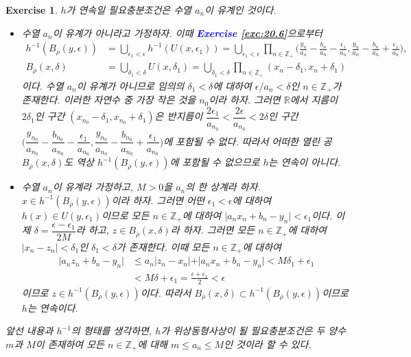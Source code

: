 \documentclass{article}
\newtheorem{exercise}{Exercise}[section]
\newcommand{\R}{\mathbb{R}}
\newcommand{\Z}{\mathbb{Z}}
\begin{document}
\begin{exercise}
    $h$가 연속일 필요충분조건은 수열 $a_n$이 유계인 것이다.
    \begin{itemize}
        \item[($\Longrightarrow$)] 수열 $a_n$이 유계가 아니라고 가정하자. 이때 \textcolor{blue}{\textbf{Exercise \ref{exc:20.6}}}으로부터
            \begin{align*}
                h^{-1}(B_{\overline{\rho}}(y,\epsilon))&=\bigcup_{\epsilon_1<\epsilon}h^{-1}(U(x,\epsilon_1))=\bigcup_{\epsilon_1<\epsilon}\prod_{n\in\Z_+}\biggl(\frac{y_n}{a_n}-\frac{b_n}{a_n}-\frac{\epsilon_1}{a_n},\frac{y_n}{a_n}-\frac{b_n}{a_n}+\frac{\epsilon_1}{a_n}\biggr),\\[6pt]
                B_{\overline{\rho}}(x,\delta)&=\bigcup_{\delta_1<\delta}U(x,\delta_1)=\bigcup_{\delta_1<\delta}\prod_{n\in\Z_+}(x_n-\delta_1,x_n+\delta_1)
            \end{align*}
            이다. 수열 $a_n$이 유계가 아니므로 임의의 $\delta_1<\delta$에 대하여 $\epsilon/a_n<\delta$인 $n\in\Z_+$가 존재한다. 이러한 자연수 중 가장 작은 것을 $n_0$이라 하자. 그러면 $\R$에서 지름이 $2\delta_1$인 구간 $(x_{n_0}-\delta_1,x_{n_0}+\delta_1)$은 반지름이 $\dfrac{2\epsilon_1}{a_{n_0}}<\dfrac{2\epsilon}{a_{n_0}}<2\delta$인 구간 $\biggl(\dfrac{y_{n_0}}{a_{n_0}}-\dfrac{b_{n_0}}{a_{n_0}}-\dfrac{\epsilon_1}{a_{n_0}},\dfrac{y_{n_0}}{a_{n_0}}-\dfrac{b_{n_0}}{a_{n_0}}+\dfrac{\epsilon_1}{a_{n_0}}\biggr)$에 포함될 수 없다. 따라서 어떠한 열린 공 $B_{\overline{\rho}}(x,\delta)$도 역상 $h^{-1}(B_{\overline{\rho}}(y,\epsilon))$에 포함될 수 없으므로 $h$는 연속이 아니다.
        \item[($\Longleftarrow$)] 수열 $a_n$이 유계라 가정하고, $M>0$을 $a_n$의 한 상계라 하자. $x\in h^{-1}(B_{\overline{\rho}}(y,\epsilon))$이라 하자. 그러면 어떤 $\epsilon_1<\epsilon$에 대하여 $h(x)\in U(y,\epsilon_1)$이므로 모든 $n\in\Z_+$에 대하여 $\vert a_nx_n+b_n-y_n\vert<\epsilon_1$이다. 이제 $\delta=\dfrac{\epsilon-\epsilon_1}{2M}$라 하고, $z\in B_{\overline{\rho}}(x,\delta)$라 하자. 그러면 모든 $n\in\Z_+$에 대하여 $\vert x_n-z_n\vert<\delta_1$인 $\delta_1<\delta$가 존재한다. 이때 모든 $n\in\Z_+$에 대하여
            \begin{align*}
                \vert a_nz_n+b_n-y_n\vert&\leq a_n\vert z_n-x_n\vert+\vert a_nx_n+b_n-y_n\vert<M\delta_1+\epsilon_1\\
                &<M\delta+\epsilon_1=\frac{\epsilon+\epsilon_1}{2}<\epsilon
            \end{align*}
            이므로 $z\in h^{-1}(B_{\overline{\rho}}(y,\epsilon))$이다. 따라서 $B_{\overline{\rho}}(x,\delta)\subset h^{-1}(B_{\overline{\rho}}(y,\epsilon))$이므로 $h$는 연속이다.
    \end{itemize}
    앞선 내용과 $h^{-1}$의 형태를 생각하면, $h$가 위상동형사상이 될 필요충분조건은 두 양수 $m$과 $M$이 존재하여 모든 $n\in\Z_+$에 대해 $m\leq a_n\leq M$인 것이라 할 수 있다.
\end{exercise}
\end{document}
